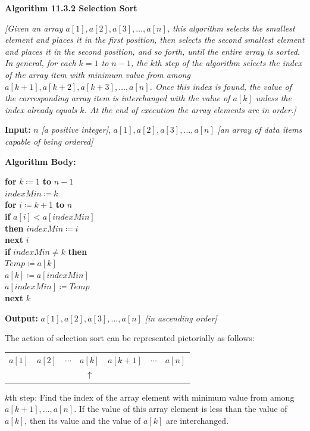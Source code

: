 \documentclass[14pt]{extarticle}
\newcommand{\ua}{\uparrow}
\newcommand{\cy}{\color{cyan}}
\begin{document}
\begin{tcolorbox}[colframe=cyan]
    {\bf \cy Algorithm 11.3.2 Selection Sort}

    {\it [Given an array \(a[1], a[2], a[3], \ldots, a[n]\), this algorithm selects the smallest element and places it in the
            first position, then selects the second smallest element and places it in the second position, and so forth, until the
            entire array is sorted. In general, for each \(k = 1\) to \(n - 1\), the \(k\)th step of the algorithm selects the index of
            the array item with minimum value from among \(a[k + 1], a[k + 2], a[k + 3], \ldots, a[n]\). Once this index is found, the
            value of the corresponding array item is interchanged with the value of \(a[k]\) unless the index already equals \(k\). At
            the end of execution the array elements are in order.]}

    {\bf Input:} \(n\) {\it [a positive integer]}, \(a[1], a[2], a[3], \ldots, a[n]\) {\it [an array of data items capable of
                being ordered]}

        {\bf Algorithm Body:}
    \begin{tabbing}
        {\bf for} \= \(k \coloneqq 1\) {\bf to} \(n-1\) \\
        \> \(indexMin \coloneqq k\) \\
        \> {\bf for} \= \(i \coloneqq k+1\) {\bf to} \(n\)\\
        \>           \> {\bf if} \(a[i] < a[indexMin]\) \\
        \>           \> {\bf then} \(indexMin\coloneqq i\)\\
        \> {\bf next} \(i\) \\
        \> {\bf if} \(indexMin \neq k\) {\bf then} \\
        \>           \> \(Temp \coloneqq a[k]\) \\
        \>           \> \(a[k] \coloneqq a[indexMin]\) \\
        \>           \> \(a[indexMin] \coloneqq Temp\) \\
        {\bf next} \(k\)
    \end{tabbing}

    {\bf Output:} \(a[1], a[2], a[3], \ldots, a[n]\) {\it [in ascending order]}

    The action of selection sort can be represented pictorially as follows:

    \begin{tabular}{ccccccc}
        \(a[1]\) & \(a[2]\) & \(\cdots\) & \(\boxed{a[k]}\) & \(a[k+1]\) & \(\cdots\) & \(a[n]\) \\
                 &          &            & {\cy \(\ua\)}    &            &            &
    \end{tabular}

    {\cy \(k\)th step: Find the index of the array element with minimum value from among \(a[k + 1], \ldots, a[n]\). If the
    value of this array element is less than the value of \(a[k]\), then its value and the value of \(a[k]\) are
    interchanged.}
\end{tcolorbox}
\end{document}
